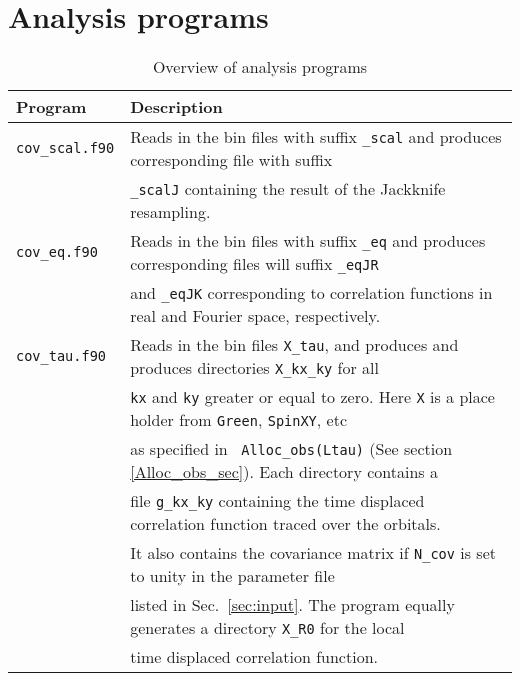 \section{ Analysis programs }\label{sec:analysis}
%
\begin{table}[h]
  \begin{tabular}{@{} l l @{}}\toprule
   Program & Description \\\midrule
   \texttt{cov\_scal.f90}  &  Reads in the bin files with suffix \texttt{\_scal}  and produces  corresponding file with suffix  \\ 
                                     &   \texttt{\_scalJ}  containing the  result of the Jackknife resampling.  \\
   \texttt{cov\_eq.f90}    &   Reads in the bin files with suffix \texttt{\_eq}  and produces  corresponding files will suffix  \texttt{\_eqJR}  \\
                                     &   and  \texttt{\_eqJK}   corresponding to correlation functions in real and Fourier space, respectively.  \\
   \texttt{cov\_tau.f90}   &   Reads in the bin files  \texttt{X\_tau}, and produces   and produces directories  \texttt{X\_kx\_ky}   for all  \\
                                     &   \texttt{kx} and \texttt{ky} greater or equal to zero.   Here \texttt{X}  is a place holder from \texttt{Green}, \texttt{SpinXY}, etc  \\
                                     &  as specified in \texttt{ Alloc\_obs(Ltau)} (See section \ref{Alloc_obs_sec}).  Each directory contains  a \\ 
                                     &   file    \texttt{g\_kx\_ky}    containing the  time displaced correlation function traced over the  orbitals.  \\ 
                                     &  It also contains the  covariance matrix if \texttt{N\_cov} is set to unity in the parameter file  \\
                                     &  listed in Sec.~\ref{sec:input}.  The program equally generates a directory  \texttt{X\_R0}  for the local \\
                                     &  time displaced  correlation function.  \\\bottomrule
   \end{tabular}
   \caption{ Overview of analysis programs \label{table:analysis_programs}}
\end{table}
